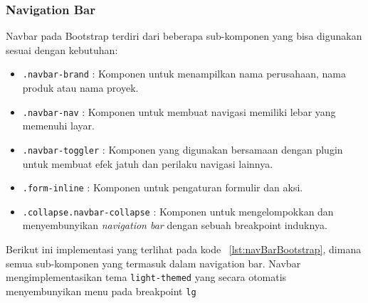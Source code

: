 \subsubsection{Navigation Bar}
Navbar pada Bootstrap terdiri dari beberapa sub-komponen yang bisa digunakan sesuai dengan kebutuhan:
\begin{itemize}
	\item \texttt{.navbar-brand} : Komponen untuk menampilkan nama perusahaan, nama produk atau nama proyek.
	\item \texttt{.navbar-nav} : Komponen untuk membuat navigasi memiliki lebar yang memenuhi layar.
	\item \texttt{.navbar-toggler} : Komponen yang digunakan bersamaan dengan plugin untuk membuat efek jatuh dan perilaku navigasi lainnya.
	\item \texttt{.form-inline} : Komponen untuk pengaturan formulir dan aksi.
	\item \texttt{.collapse.navbar-collapse} : Komponen untuk mengelompokkan dan menyembunyikan \textit{navigation bar} dengan sebuah breakpoint induknya.
\end{itemize}

Berikut ini implementasi yang terlihat pada kode ~\ref{lst:navBarBootstrap}, dimana semua sub-komponen yang termasuk dalam navigation bar. Navbar mengimplementasikan tema \texttt{light-themed} yang secara otomatis menyembunyikan menu pada breakpoint \texttt{lg}

